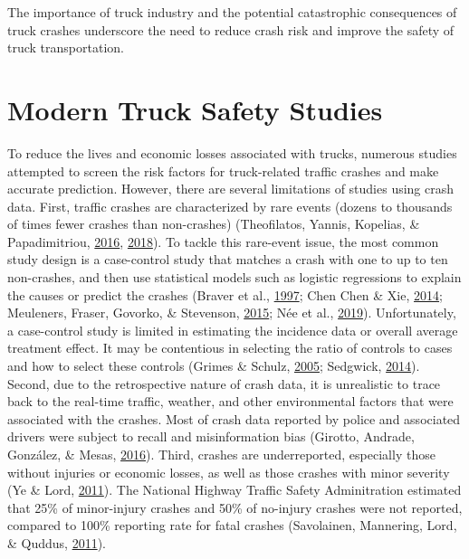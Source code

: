 \documentclass[12pt]{book}
\numberwithin{equation}{chapter}
\begin{document}
The importance of truck industry and the potential catastrophic consequences of truck crashes underscore the need to reduce crash risk and improve the safety of truck transportation.

\hypertarget{modern-truck-safety-studies}{%
\section{Modern Truck Safety Studies}\label{modern-truck-safety-studies}}

To reduce the lives and economic losses associated with trucks, numerous studies attempted to screen the risk factors for truck-related traffic crashes and make accurate prediction. However, there are several limitations of studies using crash data. First, traffic crashes are characterized by rare events (dozens to thousands of times fewer crashes than non-crashes) (Theofilatos, Yannis, Kopelias, \& Papadimitriou, \protect\hyperlink{ref-theofilatos2016predicting}{2016}, \protect\hyperlink{ref-theofilatos2018impact}{2018}). To tackle this rare-event issue, the most common study design is a case-control study that matches a crash with one to up to ten non-crashes, and then use statistical models such as logistic regressions to explain the causes or predict the crashes (Braver et al., \protect\hyperlink{ref-braver1997tractor}{1997}; Chen Chen \& Xie, \protect\hyperlink{ref-chen2014modeling}{2014}; Meuleners, Fraser, Govorko, \& Stevenson, \protect\hyperlink{ref-meuleners2015obstructive}{2015}; Née et al., \protect\hyperlink{ref-nee2019road}{2019}). Unfortunately, a case-control study is limited in estimating the incidence data or overall average treatment effect. It may be contentious in selecting the ratio of controls to cases and how to select these controls (Grimes \& Schulz, \protect\hyperlink{ref-grimes2005compared}{2005}; Sedgwick, \protect\hyperlink{ref-sedgwick2014case}{2014}). Second, due to the retrospective nature of crash data, it is unrealistic to trace back to the real-time traffic, weather, and other environmental factors that were associated with the crashes. Most of crash data reported by police and associated drivers were subject to recall and misinformation bias (Girotto, Andrade, González, \& Mesas, \protect\hyperlink{ref-girotto2016professional}{2016}). Third, crashes are underreported, especially those without injuries or economic losses, as well as those crashes with minor severity (Ye \& Lord, \protect\hyperlink{ref-ye2011investigation}{2011}). The National Highway Traffic Safety Adminitration estimated that 25\% of minor-injury crashes and 50\% of no-injury crashes were not reported, compared to 100\% reporting rate for fatal crashes (Savolainen, Mannering, Lord, \& Quddus, \protect\hyperlink{ref-savolainen2011statistical}{2011}).
\end{document}
